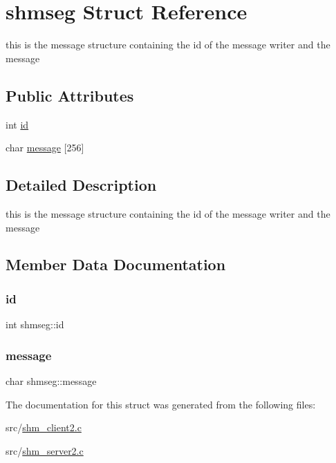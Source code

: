 \hypertarget{structshmseg}{}\section{shmseg Struct Reference}
\label{structshmseg}


this is the message structure containing the id of the message writer and the message  


\subsection*{Public Attributes}
\begin{DoxyCompactItemize}
\item 
int \hyperlink{structshmseg_a1be1260af3aed063a18e121ab8f0e3a7}{id}
\item 
char \hyperlink{structshmseg_a1d156466dfeba6cf58be88a970dd88a4}{message} \mbox{[}256\mbox{]}
\end{DoxyCompactItemize}


\subsection{Detailed Description}
this is the message structure containing the id of the message writer and the message 

\subsection{Member Data Documentation}
\mbox{\label{structshmseg_a1be1260af3aed063a18e121ab8f0e3a7}} 
\subsubsection{\texorpdfstring{id}{id}}
{\footnotesize\ttfamily int shmseg\+::id}

\mbox{\label{structshmseg_a1d156466dfeba6cf58be88a970dd88a4}} 
\subsubsection{\texorpdfstring{message}{message}}
{\footnotesize\ttfamily char shmseg\+::message}



The documentation for this struct was generated from the following files\+:\begin{DoxyCompactItemize}
\item 
src/\hyperlink{shm__client2_8c}{shm\+\_\+client2.\+c}\item 
src/\hyperlink{shm__server2_8c}{shm\+\_\+server2.\+c}\end{DoxyCompactItemize}
